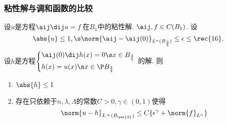 \subsubsection{粘性解与调和函数的比较}
\begin{lemma} \label{comp_with_h}
    设$u$是方程$\aij \dij u=f$在$B_1$中的粘性解.  $\aij, f \in C(B_1)$.  设
    \begin{equation}
        \abs{u} \le 1, \s \norm{\aij-\aij(0)}_{L^n(B_\frac{3}{4})} \le \epsilon \le \rec{16}.  
    \end{equation}
    设$h$是方程$\left\{ \begin{aligned}
        &\aij(0)\dij h(x)=0 \s x \in B_\frac{3}{4} \\
        & h(x)=u(x) \s x \in \P B_{\frac{3}{4}}
    \end{aligned}
    \right.  $
    的解.  则
    \begin{enumerate}
        \item $\abs{h} \le 1$
        \item 存在只依赖于$n, \lambda, \Lambda$的常数$C>0, \gamma \in (0, 1)$使得
        \begin{equation}
            \norm{u-h}_{L^\infty(B_\rec{2})} \le C \{ \epsilon^\gamma +\norm{f}_{L^n}\}
        \end{equation}
    \end{enumerate}
\end{lemma}

